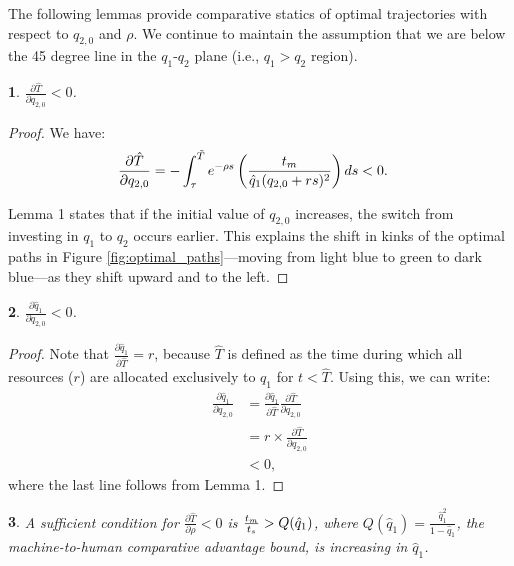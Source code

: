 \documentclass{article}
\theoremstyle{plain}
\newtheorem{lem}{\protect\lemmaname}
\newtheorem{lem}{\protect\lemmaname}[chapter]
\theoremstyle{plain}
\providecommand{\lemmaname}{Lemma}
\begin{document}
The following lemmas provide comparative statics of optimal trajectories with respect to $q_{2,0}$ and $\rho$.  
We continue to maintain the assumption that we are below the 45 degree line in the $q_{1}$-$q_{2}$ plane (i.e., $q_{1}>q_{2}$ region).
\begin{lem}
$\frac{\partial\hat{T}}{\partial q_{2,0}}<0$.
\end{lem}

\begin{proof}
We have:
\begin{align*}
\frac{\partial\hat{T}}{\partial q_{2,0}} & = -\int_{\tau}^{\tilde{T}} e^{-\rho s}\left(\frac{t_{m}}{\hat{q}_{1}(q_{2,0}+rs)^{2}}\right)ds < 0.
\end{align*}

\noindent Lemma 1 states that if the initial value of $q_{2,0}$ increases, the switch from investing in $q_{1}$ to $q_{2}$ occurs earlier.  
This explains the shift in kinks of the optimal paths in Figure \ref{fig:optimal_paths}---moving from light blue to green to dark blue---as they shift upward and to the left.
\end{proof}

\begin{lem}
$\frac{\partial\hat{q}_{1}}{\partial q_{2,0}}<0$.
\end{lem}

\begin{proof}
Note that $\frac{\partial\hat{q}_{1}}{\partial\hat{T}}=r$, because $\hat{T}$ is defined as the time during which all resources ($r$) are allocated exclusively to $q_{1}$ for $t<\hat{T}$.  
Using this, we can write:
\begin{align*}
\frac{\partial\hat{q}_{1}}{\partial q_{2,0}} & =\frac{\partial\hat{q}_{1}}{\partial\hat{T}}\frac{\partial\hat{T}}{\partial q_{2,0}}\\[1ex]
 & = r \times \frac{\partial\hat{T}}{\partial q_{2,0}}\\[1ex]
 & < 0,
\end{align*}
where the last line follows from Lemma 1.
\end{proof}

\begin{lem}
A sufficient condition for $\frac{\partial\hat{T}}{\partial\rho}<0$ is $\frac{t_{m}}{t_{s}}>Q(\hat{q}_{1})$, where $Q(\hat{q}_{1})=\frac{\hat{q}_{1}^{2}}{1-\hat{q}_{1}}$, the machine-to-human comparative advantage bound, is increasing in $\hat{q}_{1}$.
\end{lem}
\end{document}
